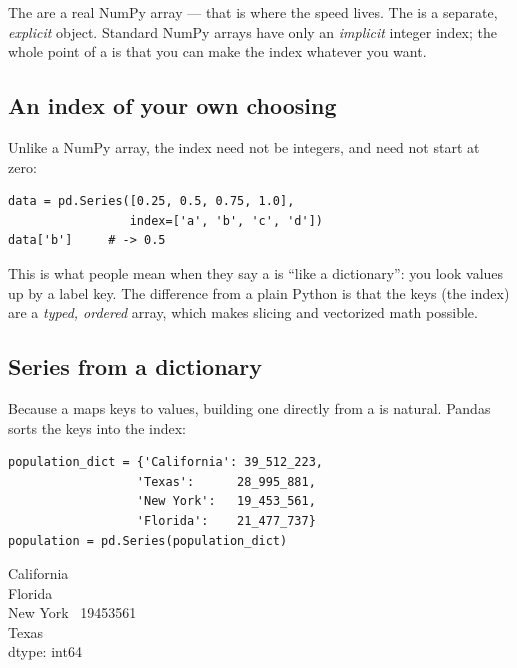 \documentclass[11pt]{article}
\begin{document}
\begin{keyidea}
The  are a real NumPy array --- that is where the speed lives. The  is a separate, \emph{explicit} object. Standard NumPy arrays have only an \emph{implicit} integer index; the whole point of a  is that you can make the index whatever you want.
\end{keyidea}

\subsection{An index of your own choosing}

Unlike a NumPy array, the index need not be integers, and need not start at zero:

\begin{lstlisting}
data = pd.Series([0.25, 0.5, 0.75, 1.0],
                 index=['a', 'b', 'c', 'd'])
data['b']     # -> 0.5
\end{lstlisting}

This is what people mean when they say a  is ``like a dictionary'': you look values up by a label key. The difference from a plain Python  is that the keys (the index) are a \emph{typed, ordered} array, which makes slicing and vectorized math possible.

\subsection{Series from a dictionary}

Because a  maps keys to values, building one directly from a  is natural. Pandas sorts the keys into the index:

\begin{lstlisting}
population_dict = {'California': 39_512_223,
                  'Texas':      28_995_881,
                  'New York':   19_453_561,
                  'Florida':    21_477_737}
population = pd.Series(population_dict)
\end{lstlisting}

\begin{outbox}
California  \\
Florida \quad\; \\
New York \quad\, 19453561 \\
Texas \quad{} \\
dtype: int64
\end{outbox}
\end{document}
